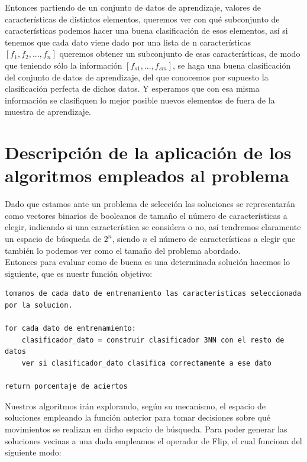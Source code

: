 \documentclass[10pt,a4paper]{article}
\begin{document}
Entonces partiendo de un conjunto de datos de aprendizaje, valores de características de distintos elementos, queremos ver con qué subconjunto de características podemos hacer una buena clasificación de esos elementos, así si tenemos que cada dato viene dado por una lista de n características $[f_1, f_2, ..., f_n]$ queremos obtener un subconjunto de esas características, de modo que teniendo sólo la información $[f_{s1}, ..., f_{sm}]$, se haga una buena clasificación del conjunto de datos de aprendizaje, del que conocemos por supuesto la clasificación perfecta de dichos datos. Y esperamos que con esa misma información se clasifiquen lo mejor posible nuevos elementos de fuera de la muestra de aprendizaje.\\

\newpage

\section{\color[rgb]{0.0,0.0,0.21}Descripción de la aplicación de los algoritmos empleados al problema}

Dado que estamos ante un problema de selección las soluciones se representarán como vectores binarios de booleanos de tamaño el número de características a elegir, indicando si una característica se considera o no, así tendremos claramente un espacio de búsqueda de $2^n$, siendo $n$ el número de características a elegir que también lo podemos ver como el tamaño del problema abordado.\\

Entonces para evaluar como de buena es una determinada solución hacemos lo siguiente, que es nuestr función objetivo:\\

\begin{lstlisting}
tomamos de cada dato de entrenamiento las caracteristicas seleccionada por la solucion.

for cada dato de entrenamiento:
	clasificador_dato = construir clasificador 3NN con el resto de datos
	ver si clasificador_dato clasifica correctamente a ese dato
	
return porcentaje de aciertos
\end{lstlisting}

Nuestros algoritmos irán explorando, según su mecanismo, el espacio de soluciones empleando la función anterior para tomar decisiones sobre qué movimientos se realizan en dicho espacio de búsqueda. Para poder generar las soluciones vecinas a una dada empleamos el operador de Flip, el cual funciona del siguiente modo:\\
\end{document}
